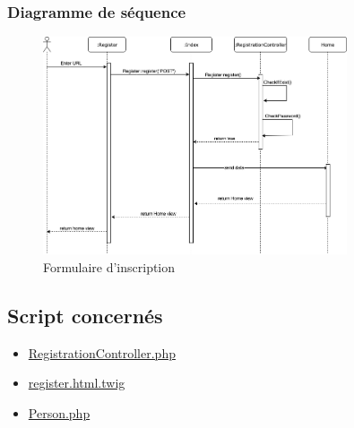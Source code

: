 \subsubsection{Diagramme de séquence}
	\begin{figure}[h]
		\includegraphics[width=0.8\textwidth,center]{Diagramme/sequence-us1}
		\caption{Formulaire d'inscription}
	\end{figure}
	
	
\subsection{Script concernés}
	\begin{itemize}
		\item \href{https://github.com/victorsmits/Aquabike/blob/master/backend/src/Controller/RegistrationController.php}{RegistrationController.php}
		\item \href{https://github.com/victorsmits/Aquabike/blob/master/backend/templates/registration/register.html.twig}{register.html.twig}
		\item \href{https://github.com/victorsmits/Aquabike/blob/master/backend/src/Entity/Person.php}{Person.php}
	\end{itemize}